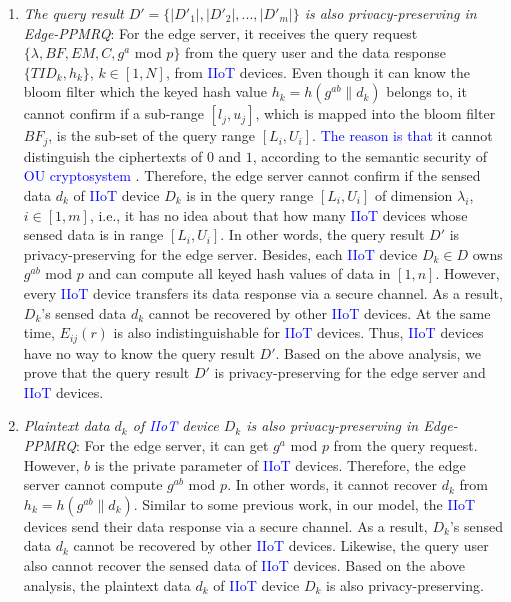 \documentclass[IEEE JOURNAL OF BIOMEDICAL AND HEALTH INFORMATICS]{IEEEtran}
\begin{document}
{\begin{enumerate}
	\item \emph{The query result $D'=\{|D'_1|, |D'_2|, ... , |D'_m|\}$ is also privacy-preserving in Edge-PPMRQ}:
	For the edge server, it receives the query request $\{\lambda, BF, EM, C, g^a$ mod $p\}$ from the query user and the data response $\{TID_k, h_k\}$, $k \in [1, N]$, from \textcolor{blue}{IIoT} devices. Even though it can know the bloom filter which the keyed hash value $h_k=h(g^{ab} \| d_k)$ belongs to,
	it cannot confirm if a sub-range $[l_j, u_j]$, which is mapped into the bloom filter $BF_j$, is the sub-set of the query range $[L_i, U_i]$. \textcolor{blue}{The reason is that} it cannot distinguish the ciphertexts of $0$ and $1$, according to the semantic security of \textcolor{blue}{OU cryptosystem} \cite{ou1998}.
    Therefore, the edge server cannot confirm if the sensed data $d_k$ of \textcolor{blue}{IIoT} device $D_k$ is in the query range $[L_i, U_i]$ of dimension $\lambda_i$, $i\in [1, m]$, i.e., it has no idea about that how many \textcolor{blue}{IIoT} devices whose sensed data is in range $[L_i, U_i]$. In other words, the query result $D'$ is privacy-preserving for the edge server. Besides, each \textcolor{blue}{IIoT} device $D_k \in D$ owns $g^{ab}$ mod $p$ and can compute all keyed hash values of data in $[1, n]$. However, every \textcolor{blue}{IIoT} device transfers its data response via a secure channel. As a result, $D_k$'s sensed data $d_k$ cannot be recovered by other \textcolor{blue}{IIoT} devices. At the same time, $E_{ij}(r)$ is also indistinguishable for \textcolor{blue}{IIoT} devices. Thus, \textcolor{blue}{IIoT} devices have no way to know the query result $D'$. Based on the above analysis, we prove that the query result $D'$ is privacy-preserving for the edge server and \textcolor{blue}{IIoT} devices.
	
	\item \emph{Plaintext data $d_k$ of \textcolor{blue}{IIoT} device $D_k$ is also privacy-preserving in Edge-PPMRQ}:
	For the edge server, it can get $g^a$ mod $p$ from the query request. However, $b$ is the private parameter of \textcolor{blue}{IIoT} devices. Therefore, the edge server cannot compute $g^{ab}$ mod $p$. In other words, it cannot recover $d_k$ from $h_k=h(g^{ab}\| d_k)$. Similar to some previous work, in our model, the \textcolor{blue}{IIoT} devices send their data response via a secure channel. As a result, $D_k$'s sensed data $d_k$ cannot be recovered by other \textcolor{blue}{IIoT} devices. Likewise, the query user also cannot recover the sensed data of \textcolor{blue}{IIoT} devices. Based on the above analysis, the plaintext data $d_k$ of \textcolor{blue}{IIoT} device $D_k$ is also privacy-preserving.
\end{enumerate}


}
\end{document}
